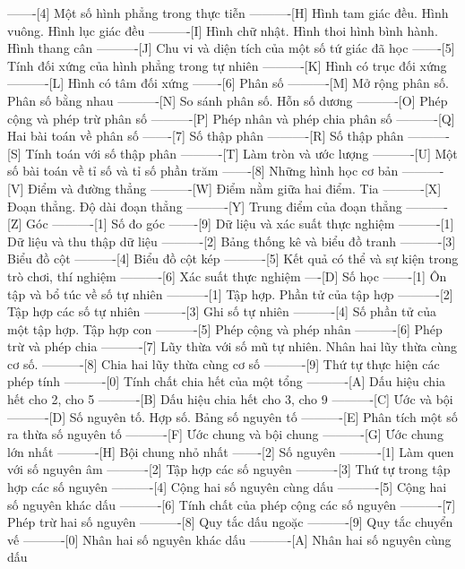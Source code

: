 -------[4] Một số hình phẳng trong thực tiễn
----------[H] Hình tam giác đều. Hình vuông. Hình lục giác đều
----------[I] Hình chữ nhật. Hình thoi hình bình hành. Hình thang cân
----------[J] Chu vi và diện tích của một số tứ giác đã học
-------[5] Tính đối xứng của hình phẳng trong tự nhiên
----------[K] Hình có trục đối xứng
----------[L] Hình có tâm đối xứng
-------[6] Phân số
----------[M] Mở rộng phân số. Phân số bằng nhau
----------[N] So sánh phân số. Hỗn số dương
----------[O] Phép cộng và phép trừ phân số
----------[P] Phép nhân và phép chia phân số
----------[Q] Hai bài toán về phân số
-------[7] Số thập phân
----------[R] Số thập phân
----------[S] Tính toán với số thập phân
----------[T] Làm tròn và ước lượng
----------[U] Một số bài toán về tỉ số và tỉ số phần trăm
-------[8] Những hình học cơ bản
----------[V] Điểm và đường thẳng
----------[W] Điểm nằm giữa hai điểm. Tia
----------[X] Đoạn thẳng. Độ dài đoạn thẳng
----------[Y] Trung điểm của đoạn thẳng
----------[Z] Góc
----------[1] Số đo góc
-------[9] Dữ liệu và xác suất thực nghiệm
----------[1] Dữ liệu và thu thập dữ liệu
----------[2] Bảng thống kê và biểu đồ tranh
----------[3] Biểu đồ cột
----------[4] Biểu đồ cột kép
----------[5] Kết quả có thể và sự kiện trong trò chơi, thí nghiệm
----------[6] Xác suất thực nghiệm
----[D] Số học
-------[1] Ôn tập và bổ túc về số tự nhiên
----------[1] Tập hợp. Phần tử của tập hợp
----------[2] Tập hợp các số tự nhiên
----------[3] Ghi số tự nhiên
----------[4] Số phần tử của một tập hợp. Tập hợp con
----------[5] Phép cộng và phép nhân
----------[6] Phép trừ và phép chia
----------[7] Lũy thừa với số mũ tự nhiên. Nhân hai lũy thừa cùng cơ số.
----------[8] Chia hai lũy thừa cùng cơ số
----------[9] Thứ tự thực hiện các phép tính
----------[0] Tính chất chia hết của một tổng
----------[A] Dấu hiệu chia hết cho 2, cho 5
----------[B] Dấu hiệu chia hết cho 3, cho 9
----------[C] Ước và bội
----------[D] Số nguyên tố. Hợp số. Bảng số nguyên tố
----------[E] Phân tích một số ra thừa số nguyên tố
----------[F] Ước chung và bội chung
----------[G] Ước chung lớn nhất
----------[H] Bội chung nhỏ nhất
-------[2] Số nguyên
----------[1] Làm quen với số nguyên âm
----------[2] Tập hợp các số nguyên
----------[3] Thứ tự trong tập hợp các số nguyên
----------[4] Cộng hai số nguyên cùng dấu
----------[5] Cộng hai số nguyên khác dấu
----------[6] Tính chất của phép cộng các số nguyên
----------[7] Phép trừ hai số nguyên
----------[8] Quy tắc dấu ngoặc
----------[9] Quy tắc chuyển vế
----------[0] Nhân hai số nguyên khác dấu
----------[A] Nhân hai số nguyên cùng dấu
